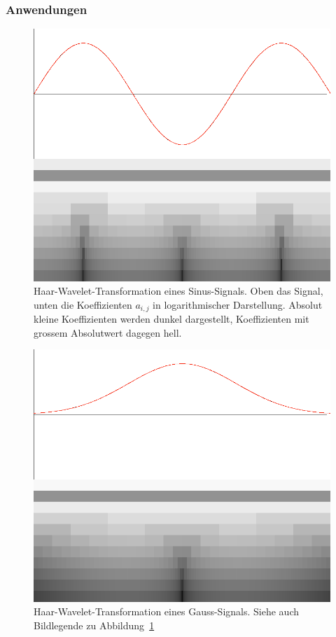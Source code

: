 \subsubsection{Anwendungen}
\begin{figure}
\begin{center}
\includegraphics[width=\hsize]{graphics/wavelet-sin3}
\end{center}
\caption{Haar-Wavelet-Transformation eines Sinus-Signals. Oben das Signal,
unten die Koeffizienten $a_{i,j}$ in logarithmischer Darstellung.
Absolut kleine Koeffizienten werden dunkel dargestellt, Koeffizienten
mit grossem Absolutwert dagegen hell.\label{wavelet-sin}}
\end{figure}
\begin{figure}
\begin{center}
\includegraphics[width=\hsize]{graphics/wavelet-normal}
\end{center}
\caption{Haar-Wavelet-Transformation eines Gauss-Signals. Siehe 
auch Bildlegende zu Abbildung~\ref{wavelet-sin}\label{wavelet-normal}}
\end{figure}
